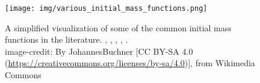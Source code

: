\begin{figure}
  \centering
  \texttt{[image: img/various\_initial\_mass\_functions.png]}
  \caption{ \label{fig:various-imf}
    A simplified visualization of some of the common initial mass functions in the literature.
    , , , , . \\
    image-credit: By JohannesBuchner [CC BY-SA 4.0 (\url{https://creativecommons.org/licenses/by-sa/4.0})], from Wikimedia Commons
  }
\end{figure}
